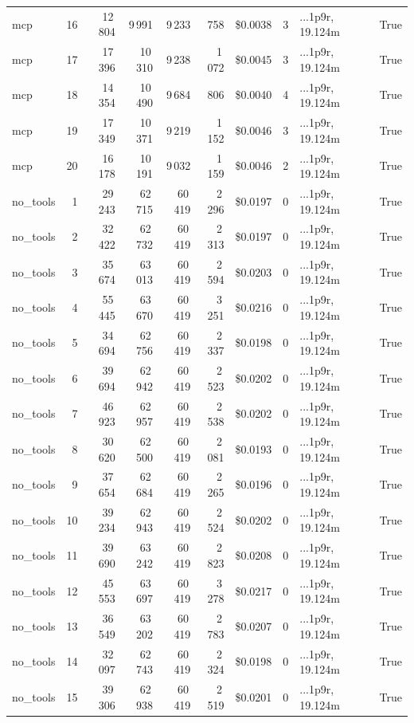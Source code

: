 \documentclass[a4paper,11pt]{article}
\begin{document}
\begin{table}[H]
{\begin{tabular}{l r r r r r r r l r}
mcp & 16 & 12\,804 & 9\,991 & 9\,233 & 758 & \$0.0038 & 3 & ...1p9r, 19.124m & True \\
mcp & 17 & 17\,396 & 10\,310 & 9\,238 & 1\,072 & \$0.0045 & 3 & ...1p9r, 19.124m & True \\
mcp & 18 & 14\,354 & 10\,490 & 9\,684 & 806 & \$0.0040 & 4 & ...1p9r, 19.124m & True \\
mcp & 19 & 17\,349 & 10\,371 & 9\,219 & 1\,152 & \$0.0046 & 3 & ...1p9r, 19.124m & True \\
mcp & 20 & 16\,178 & 10\,191 & 9\,032 & 1\,159 & \$0.0046 & 2 & ...1p9r, 19.124m & True \\
\midrule
no\_tools & 1 & 29\,243 & 62\,715 & 60\,419 & 2\,296 & \$0.0197 & 0 & ...1p9r, 19.124m & True \\
no\_tools & 2 & 32\,422 & 62\,732 & 60\,419 & 2\,313 & \$0.0197 & 0 & ...1p9r, 19.124m & True \\
no\_tools & 3 & 35\,674 & 63\,013 & 60\,419 & 2\,594 & \$0.0203 & 0 & ...1p9r, 19.124m & True \\
no\_tools & 4 & 55\,445 & 63\,670 & 60\,419 & 3\,251 & \$0.0216 & 0 & ...1p9r, 19.124m & True \\
no\_tools & 5 & 34\,694 & 62\,756 & 60\,419 & 2\,337 & \$0.0198 & 0 & ...1p9r, 19.124m & True \\
no\_tools & 6 & 39\,694 & 62\,942 & 60\,419 & 2\,523 & \$0.0202 & 0 & ...1p9r, 19.124m & True \\
no\_tools & 7 & 46\,923 & 62\,957 & 60\,419 & 2\,538 & \$0.0202 & 0 & ...1p9r, 19.124m & True \\
no\_tools & 8 & 30\,620 & 62\,500 & 60\,419 & 2\,081 & \$0.0193 & 0 & ...1p9r, 19.124m & True \\
no\_tools & 9 & 37\,654 & 62\,684 & 60\,419 & 2\,265 & \$0.0196 & 0 & ...1p9r, 19.124m & True \\
no\_tools & 10 & 39\,234 & 62\,943 & 60\,419 & 2\,524 & \$0.0202 & 0 & ...1p9r, 19.124m & True \\
no\_tools & 11 & 39\,690 & 63\,242 & 60\,419 & 2\,823 & \$0.0208 & 0 & ...1p9r, 19.124m & True \\
no\_tools & 12 & 45\,553 & 63\,697 & 60\,419 & 3\,278 & \$0.0217 & 0 & ...1p9r, 19.124m & True \\
no\_tools & 13 & 36\,549 & 63\,202 & 60\,419 & 2\,783 & \$0.0207 & 0 & ...1p9r, 19.124m & True \\
no\_tools & 14 & 32\,097 & 62\,743 & 60\,419 & 2\,324 & \$0.0198 & 0 & ...1p9r, 19.124m & True \\
no\_tools & 15 & 39\,306 & 62\,938 & 60\,419 & 2\,519 & \$0.0201 & 0 & ...1p9r, 19.124m & True \\

\end{tabular}}
\end{table}
\end{document}
